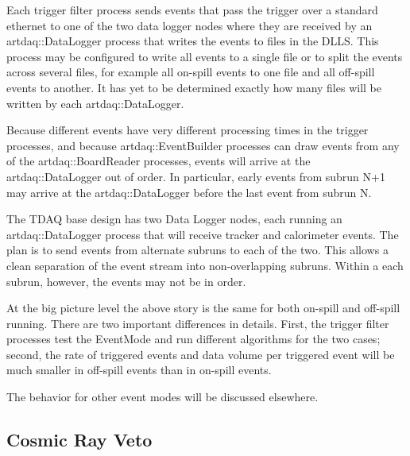 
Each \art trigger filter process sends events that pass the trigger over a standard ethernet
to one of the two data logger nodes where they are received by an {\code artdaq::DataLogger} process
that writes the events to files in the DLLS.
This process may be configured to write all events to a single file
or to split the events across several files,
for example all on-spill events to one file and all off-spill events to another.
It has yet to be determined exactly how many files will be written
by each {\code artdaq::DataLogger}.

Because different events have very different processing times in the trigger processes,
and because {\code artdaq::EventBuilder} processes can draw events from
any of the {\code artdaq::BoardReader} processes, events will arrive at the
{\code artdaq::DataLogger} out of order.  In particular, early events from subrun N+1
may arrive at the {\code artdaq::DataLogger} before the last event from subrun N.

The TDAQ base design has two Data Logger nodes, each running an
{\code artdaq::DataLogger} process that will receive tracker and calorimeter events.
The plan is to send events from alternate subruns to each of the two.
This allows a clean separation of the event stream into non-overlapping subruns.
Within a each subrun, however, the events may not be in order.


At the big picture level the above story is the same for both on-spill and off-spill running.
There are two important differences in details.
First, the trigger filter processes test the EventMode
and run different algorithms for the two cases;
second, the rate of triggered events
and data volume per triggered event will be much smaller in off-spill events than in on-spill events.


The behavior for other event modes will be discussed elsewhere.

\subsection{Cosmic Ray Veto}
\label{ssec:CRV}

